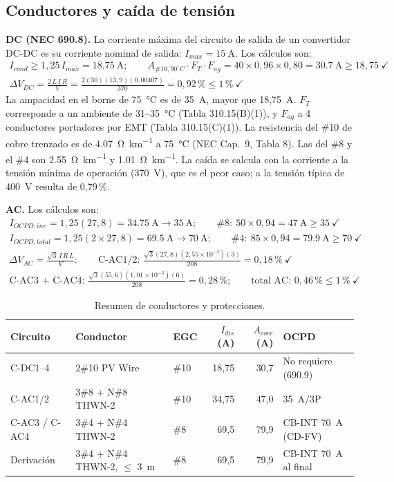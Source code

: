 \documentclass[12pt]{article}
\begin{document}
\subsection{Conductores y caída de tensión}
\textbf{DC (NEC 690.8).} La corriente máxima del circuito de salida de un convertidor DC-DC es su corriente nominal de salida: $I_{max}=\SI{15}{\ampere}$. Los cálculos son:
\begin{gather}
I_{cond}\geq1{,}25\,I_{max}=\SI{18.75}{\ampere};\qquad A_{\#10,90^\circ C}\cdot F_T\cdot F_{ag}=40\times0{,}96\times0{,}80=\SI{30.7}{\ampere}\geq18{,}75\ \checkmark\\
\Delta V_{DC}=\frac{2\,L\,I\,R}{V}=\frac{2(30)(13{,}9)(0{,}00407)}{370}=0{,}92\,\text{\%}\leq1\,\text{\%}\ \checkmark
\end{gather}
La ampacidad en el borne de 75~°C es de 35~A, mayor que 18,75~A. $F_T$ corresponde a un ambiente de 31--35~°C (Tabla 310.15(B)(1)), y $F_{ag}$ a 4 conductores portadores por EMT (Tabla 310.15(C)(1)). La resistencia del \#10 de cobre trenzado es de \SI{4.07}{\ohm\per\kilo\meter} a \SI{75}{\celsius} (NEC Cap.~9, Tabla 8). Las del \#8 y el \#4 son \SI{2.55}{\ohm\per\kilo\meter} y \SI{1.01}{\ohm\per\kilo\meter}. La caída se calcula con la corriente a la tensión mínima de operación (370~V), que es el peor caso; a la tensión típica de 400~V resulta de 0,79\,\%.

\textbf{AC.} Los cálculos son:
\begin{gather}
I_{OCPD,inv}=1{,}25(27{,}8)=\SI{34.75}{\ampere}\rightarrow\SI{35}{\ampere};\qquad \#8:\ 50\times0{,}94=\SI{47}{\ampere}\geq35\ \checkmark\\
I_{OCPD,total}=1{,}25(2\times27{,}8)=\SI{69.5}{\ampere}\rightarrow\SI{70}{\ampere};\qquad \#4:\ 85\times0{,}94=\SI{79.9}{\ampere}\geq70\ \checkmark\\
\Delta V_{AC}=\frac{\sqrt3\,I\,R\,L}{V}:\qquad \text{C-AC1/2: } \frac{\sqrt3(27{,}8)(2{,}55\times10^{-3})(3)}{208}=0{,}18\,\text{\%}\ \checkmark\\
\text{C-AC3 + C-AC4: } \frac{\sqrt3(55{,}6)(1{,}01\times10^{-3})(6)}{208}=0{,}28\,\text{\%};\qquad \text{total AC: }0{,}46\,\text{\%}\leq1\,\text{\%}\ \checkmark
\end{gather}

\begin{table}[H]
\centering\small
\caption{Resumen de conductores y protecciones.}\label{tab:conductores}
\begin{tabular}{L{2.4cm}L{3.6cm}lrrL{2.6cm}}
\toprule
\textbf{Circuito} & \textbf{Conductor} & \textbf{EGC} & $I_{dis}$ (A) & $A_{corr}$ (A) & \textbf{OCPD}\\
\midrule
C-DC1--4 & 2\#10 PV Wire & \#10 & 18,75 & 30,7 & No requiere (690.9)\\
C-AC1/2 & 3\#8 + N\#8 THWN-2 & \#10 & 34,75 & 47,0 & 35~A/3P\\
C-AC3 / C-AC4 & 3\#4 + N\#4 THWN-2 & \#8 & 69,5 & 79,9 & CB-INT 70~A (CD-FV)\\
Derivación & 3\#4 + N\#4 THWN-2, $\leq$ 3~m & \#8 & 69,5 & 79,9 & CB-INT 70~A al final\\
\bottomrule
\end{tabular}
\end{table}
\end{document}
